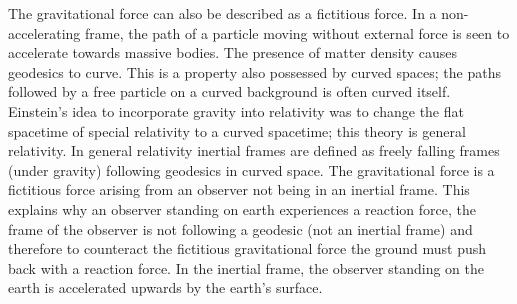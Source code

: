 The gravitational force can also be described as a fictitious force. In a non-accelerating frame, the path of a particle moving without external force is seen to accelerate towards massive bodies. The presence of matter density causes geodesics to curve. This is a property also possessed by curved spaces; the paths followed by a free particle on a curved background is often curved itself. Einstein's idea to incorporate gravity into relativity was to change the flat spacetime of special relativity to a curved spacetime; this theory is general relativity.  In general relativity inertial frames are defined as freely falling frames (under gravity) following geodesics in curved space. The gravitational force is a fictitious force arising from an observer not being in an inertial frame. This explains why an observer standing on earth experiences a reaction force, the frame of the observer is not following a geodesic (not an inertial frame) and therefore to counteract the fictitious gravitational force the ground must push back with a reaction force. In the inertial frame, the observer standing on the earth is accelerated upwards by the earth's surface.


